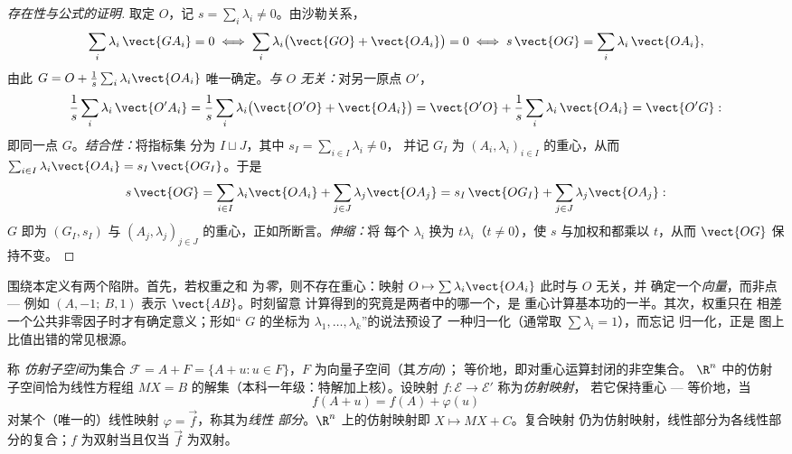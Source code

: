 \begin{proof}[存在性与公式的证明]
取定 $O$，记 $s = \sum_i\lambda_i \neq 0$。由沙勒关系，
\[
\sum_i\lambda_i\,\vect{GA_i} = 0
\iff \sum_i\lambda_i\bigl(\vect{GO} + \vect{OA_i}\bigr) = 0
\iff s\,\vect{OG} = \sum_i\lambda_i\,\vect{OA_i},
\]
由此 $G = O + \frac1s\sum_i\lambda_i\vect{OA_i}$
唯一确定。\emph{与 $O$ 无关：}对另一原点
$O'$，
\[
\frac1s\sum_i\lambda_i\,\vect{O'A_i}
= \frac1s\sum_i\lambda_i\bigl(\vect{O'O} + \vect{OA_i}\bigr)
= \vect{O'O} + \frac1s\sum_i\lambda_i\,\vect{OA_i}
= \vect{O'G} :
\]
即同一点 $G$。\emph{结合性：}将指标集
分为 $I \sqcup J$，其中 $s_I = \sum_{i\in I}\lambda_i \neq 0$，
并记 $G_I$ 为 $(A_i, \lambda_i)_{i\in
I}$ 的重心，从而 $\sum_{i\in I}\lambda_i\vect{OA_i} =
s_I\,\vect{OG_I}$。于是
\[
s\,\vect{OG}
= \sum_{i\in I}\lambda_i\vect{OA_i} +
\sum_{j\in J}\lambda_j\vect{OA_j}
= s_I\,\vect{OG_I} + \sum_{j\in J}\lambda_j\vect{OA_j} :
\]
$G$ 即为 $(G_I, s_I)$ 与 $(A_j,
\lambda_j)_{j\in J}$ 的重心，正如所断言。\emph{伸缩：}将
每个 $\lambda_i$ 换为 $t\lambda_i$（$t \neq 0$），使 $s$
与加权和都乘以 $t$，从而 $\vect{OG}$ 保持不变。
\end{proof}

\begin{remark}[常见误区]
围绕本定义有两个陷阱。首先，若权重之和
为\emph{零}，则不存在重心：映射 $O \mapsto
\sum\lambda_i\vect{OA_i}$ 此时与 $O$ 无关，并
确定一个\emph{向量}，而非点 --- 例如
$(A, -1;\ B, 1)$ 表示 $\vect{AB}$。时刻留意
计算得到的究竟是两者中的哪一个，是
重心计算基本功的一半。其次，权重只在
相差一个公共非零因子时才有确定意义；形如“
$G$ 的坐标为 $\lambda_1, \dots, \lambda_k$”的说法预设了
一种归一化（通常取 $\sum\lambda_i = 1$），而忘记
归一化，正是
图上比值出错的常见根源。
\end{remark}

\begin{definition}\label{def:b2:affine:subspace}
称 \emph{仿射子空间}为集合 $\mathcal{F} = A + F = \{A + u :
u \in F\}$，$F$ 为向量子空间（其\emph{方向}）；
等价地，即对重心运算封闭的非空集合。
$\R^n$ 中的仿射子空间恰为线性方程组
$MX = B$ 的解集（本科一年级：特解加上核）。设映射 $f \colon
\mathcal{E} \to \mathcal{E}'$ 称为\emph{仿射映射}，
若它保持重心 --- 等价地，当
\[
f(A + u) = f(A) + \varphi(u)
\]
对某个（唯一的）线性映射 $\varphi = \vec f$，称其为\emph{线性
部分}。$\R^n$ 上的仿射映射即 $X \mapsto MX + C$。复合映射
仍为仿射映射，线性部分为各线性部分的复合；$f$ 为双射当且仅当 $\vec f$
为双射。
\end{definition}

